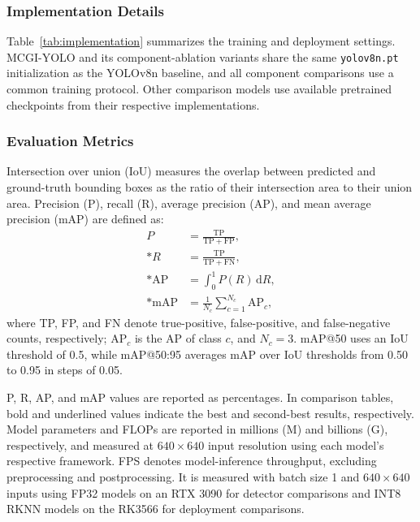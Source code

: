 \documentclass[a4paper,fleqn]{cas-dc}
\newcommand{\model}{MCGI-YOLO\xspace}
\begin{document}
\subsubsection{Implementation Details}
\label{sec:implementation}
Table~\ref{tab:implementation} summarizes the training and deployment settings. \model and its component-ablation variants share the same \texttt{yolov8n.pt} initialization as the YOLOv8n baseline, and all component comparisons use a common training protocol. Other comparison models use available pretrained checkpoints from their respective implementations.

\subsubsection{Evaluation Metrics}
\label{sec:evaluation}
Intersection over union (IoU) measures the overlap between predicted and ground-truth bounding boxes as the ratio of their intersection area to their union area. Precision (P), recall (R), average precision (AP), and mean average precision (mAP) are defined as:
\begin{align}
P &= \frac{\mathrm{TP}}{\mathrm{TP}+\mathrm{FP}},
\label{eq:precision}\\*
R &= \frac{\mathrm{TP}}{\mathrm{TP}+\mathrm{FN}},
\label{eq:recall}\\*
\mathrm{AP} &= \int_0^1 P(R)\,\mathrm{d}R,
\label{eq:ap}\\*
\mathrm{mAP} &= \frac{1}{N_c}\sum_{c=1}^{N_c}\mathrm{AP}_c,
\label{eq:metrics}
\end{align}
\noindent where TP, FP, and FN denote true-positive, false-positive, and false-negative counts, respectively; $\mathrm{AP}_c$ is the AP of class $c$, and $N_c=3$. mAP@50 uses an IoU threshold of 0.5, while mAP@50:95 averages mAP over IoU thresholds from 0.50 to 0.95 in steps of 0.05.

P, R, AP, and mAP values are reported as percentages. In comparison tables, bold and underlined values indicate the best and second-best results, respectively. Model parameters and FLOPs are reported in millions (M) and billions (G), respectively, and measured at $640\times640$ input resolution using each model's respective framework. FPS denotes model-inference throughput, excluding preprocessing and postprocessing. It is measured with batch size 1 and $640\times640$ inputs using FP32 models on an RTX 3090 for detector comparisons and INT8 RKNN models on the RK3566 for deployment comparisons.
\end{document}
